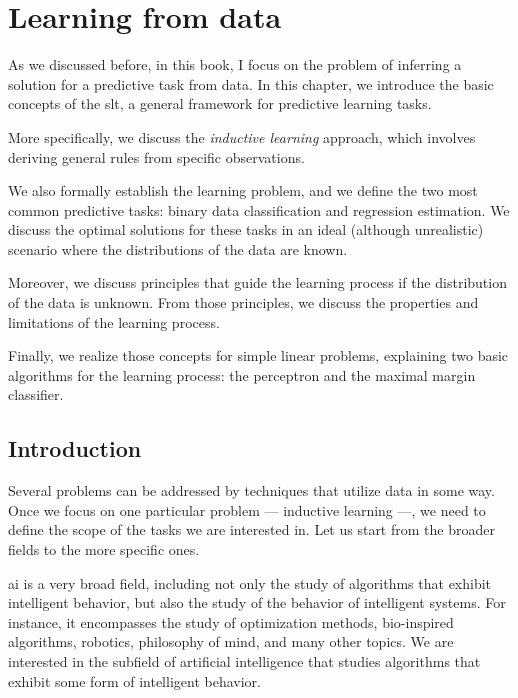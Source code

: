 \chapter{Learning from data}
\label{chap:slt}
\glsresetall

As we discussed before, in this book, I focus on the problem of inferring a solution for a
predictive task from data.  In this chapter, we introduce the basic concepts of the
\gls{slt}, a general framework for predictive learning tasks.

More specifically, we discuss the \emph{inductive learning} approach, which involves
deriving general rules from specific observations.

We also formally establish the learning problem, and we define the two most common
predictive tasks: binary data classification and regression estimation.  We discuss the
optimal solutions for these tasks in an ideal (although unrealistic) scenario where the
distributions of the data are known.

Moreover, we discuss principles that guide the learning process if the distribution of
the data is unknown.  From those principles, we discuss the properties and limitations of
the learning process.

Finally, we realize those concepts for simple linear problems, explaining two basic
algorithms for the learning process: the perceptron and the maximal margin classifier.

\section{Introduction} %

Several problems can be addressed by techniques that utilize data in some way.  Once we focus on
one particular problem --- inductive learning ---, we need to define the scope of the
tasks we are interested in.  Let us start from the broader fields to the more specific
ones.

\Gls{ai} is a very broad field, including not only the study of algorithms
that exhibit intelligent behavior, but also the study of the behavior of intelligent
systems.  For instance, it encompasses the study of optimization methods, bio-inspired algorithms,
robotics, philosophy of mind, and many other topics.  We are interested in the subfield of
artificial intelligence that studies algorithms that exhibit some form of intelligent
behavior.

